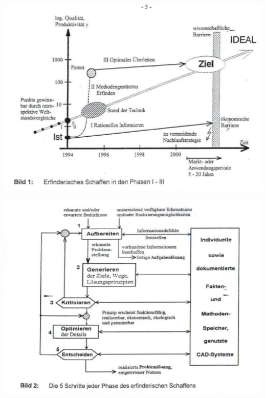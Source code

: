 \documentclass[11pt,a4paper]{article}
\begin{document}
\begin{center}
  \includegraphics[width=.9\textwidth]{HF-B.pdf}
  
  \includegraphics[width=.9\textwidth]{HF-C.pdf}
  \newpage
  

\end{center}
\end{document}
